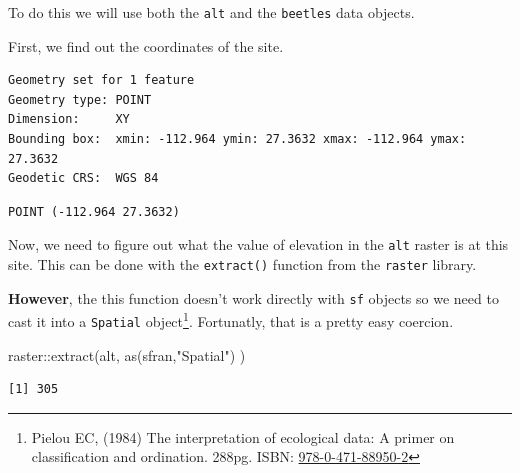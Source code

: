 \documentclass[
  letterpaper,
]{book}
\newenvironment{Shaded}{\begin{snugshade}}{\end{snugshade}}
\newcommand{\FunctionTok}[1]{\textcolor[rgb]{0.28,0.35,0.67}{#1}}
\newcommand{\NormalTok}[1]{\textcolor[rgb]{0.00,0.23,0.31}{#1}}
\newcommand{\OtherTok}[1]{\textcolor[rgb]{0.00,0.23,0.31}{#1}}
\newcommand{\SpecialCharTok}[1]{\textcolor[rgb]{0.37,0.37,0.37}{#1}}
\newcommand{\StringTok}[1]{\textcolor[rgb]{0.13,0.47,0.30}{#1}}
\begin{document}
To do this we will use both the \texttt{alt} and the \texttt{beetles}
data objects.

First, we find out the coordinates of the site.

\begin{Shaded}
\end{Shaded}

\begin{verbatim}
Geometry set for 1 feature 
Geometry type: POINT
Dimension:     XY
Bounding box:  xmin: -112.964 ymin: 27.3632 xmax: -112.964 ymax: 27.3632
Geodetic CRS:  WGS 84
\end{verbatim}

\begin{verbatim}
POINT (-112.964 27.3632)
\end{verbatim}

Now, we need to figure out what the value of elevation in the
\texttt{alt} raster is at this site. This can be done with the
\texttt{extract()} function from the \texttt{raster} library.

\textbf{However}, the this function doesn't work directly with
\texttt{sf} objects so we need to cast it into a \texttt{Spatial}
object\footnote{Pielou EC, (1984) The interpretation of ecological data:
  A primer on classification and ordination. 288pg. ISBN:
  \href{https://www.wiley.com/en-us/The+Interpretation+of+Ecological+Data\%3A+A+Primer+on+Classification+and+Ordination-p-9780471889502}{978-0-471-88950-2}}.
Fortunatly, that is a pretty easy coercion.

\begin{Shaded}
\begin{Highlighting}[]
\NormalTok{raster}\SpecialCharTok{::}\FunctionTok{extract}\NormalTok{(alt, }\FunctionTok{as}\NormalTok{(sfran,}\StringTok{"Spatial"}\NormalTok{) ) }
\end{Highlighting}
\end{Shaded}

\begin{verbatim}
[1] 305
\end{verbatim}
\end{document}

